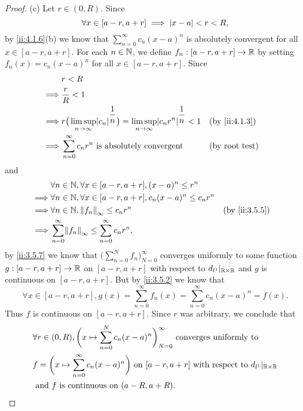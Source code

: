 \begin{proof}{(c)}
  Let \(r \in (0, R)\).
  Since
  \[
    \forall x \in [a - r, a + r] \implies \left\lvert x - a\right\rvert < r < R,
  \]
  by \cref{ii:4.1.6}(b) we know that \(\sum_{n = 0}^\infty c_n (x - a)^n\) is absolutely convergent for all \(x \in [a - r, a + r]\).
  For each \(n \in \mathbb{N}\), we define \(f_n : [a - r, a + r] \to \mathbb{R}\) by setting \(f_n(x) = c_n (x - a)^n\) for all \(x \in [a - r, a + r]\).
  Since
  \begin{align*}
             & r < R                                                                                                                                            \\
    \implies & \dfrac{r}{R} < 1                                                                                                                                 \\
    \implies & r \big(\limsup_{n \to \infty} \abs{c_n}^{\dfrac{1}{n}}\big) = \limsup_{n \to \infty} \abs{c_n r^n}^{\dfrac{1}{n}} < 1 &  & \by{ii:4.1.3}         \\
    \implies & \sum_{n = 0}^\infty c_n r^n \text{ is absolutely convergent}                                                          &  & \text{(by root test)}
  \end{align*}
  and
  \begin{align*}
             & \forall n \in \N, \forall x \in [a - r, a + r], (x - a)^n \leq r^n                            \\
    \implies & \forall n \in \N, \forall x \in [a - r, a + r], c_n (x - a)^n \leq c_n r^n                    \\
    \implies & \forall n \in \N, \norm*{f_n}_\infty \leq c_n r^n                          &  & \by{ii:3.5.5} \\
    \implies & \sum_{n = 0}^\infty \norm*{f_n}_\infty \leq \sum_{n = 0}^\infty c_n r^n,
  \end{align*}
  by \cref{ii:3.5.7} we know that \(\big(\sum_{n = 0}^N f_n\big)_{N = 0}^\infty\) converges uniformly to some function \(g : [a - r, a + r] \to \mathbb{R}\) on \([a - r, a + r]\) with respect to \(d_{l^1}|_{\mathbb{R} \times \mathbb{R}}\) and \(g\) is continuous on \([a - r, a + r]\).
  But by \cref{ii:3.5.2} we know that
  \[
    \forall x \in [a - r, a + r], g(x) = \sum_{n = 0}^\infty f_n(x) = \sum_{n = 0}^\infty c_n (x - a)^n = f(x).
  \]
  Thus \(f\) is continuous on \([a - r, a + r]\).
  Since \(r\) was arbitrary, we conclude that
  \begin{align*}
     & \forall r \in (0, R), \bigg(x \mapsto \sum_{n = 0}^N c_n (x - a)^n\bigg)_{N = 0}^\infty \text{ converges uniformly to }                 \\
     & f = \bigg(x \mapsto \sum_{n = 0}^\infty c_n (x - a)^n\bigg) \text{ on } [a - r, a + r] \text{ with respect to } d_{l^1}|_{\mathbb{R} \times \mathbb{R}} \\
     & \text{ and } f \text{ is continuous on } (a - R, a + R).
  \end{align*}
\end{proof}

